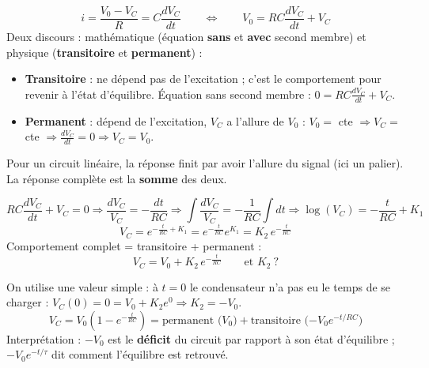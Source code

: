 \begin{thmbox}[title=Équation du passe-bas]
\[ i = \frac{V_0 - V_C}{R} = C\frac{dV_C}{dt} \qquad\Longleftrightarrow\qquad
   V_0 = RC\frac{dV_C}{dt} + V_C \]
Deux discours : mathématique (équation \textbf{sans} et \textbf{avec} second membre) et
physique (\textbf{transitoire} et \textbf{permanent}) :
\begin{itemize}
  \item \textbf{Transitoire} : ne dépend pas de l'excitation ; c'est le comportement pour
        revenir à l'état d'équilibre. Équation sans second membre :
        $0 = RC\frac{dV_C}{dt} + V_C$.
  \item \textbf{Permanent} : dépend de l'excitation, $V_C$ a l'allure de $V_0$ :
        $V_0 = $ cte $\Rightarrow V_C = $ cte $\Rightarrow \frac{dV_C}{dt} = 0 \Rightarrow V_C = V_0$.
\end{itemize}
Pour un circuit linéaire, la réponse finit par avoir l'allure du signal (ici un palier).
La réponse complète est la \textbf{somme} des deux.
\end{thmbox}


\begin{proofbox}[title=Développement]
\[ RC\frac{dV_C}{dt} + V_C = 0 \Rightarrow \frac{dV_C}{V_C} = -\frac{dt}{RC}
   \Rightarrow \int\frac{dV_C}{V_C} = -\frac1{RC}\int dt
   \Rightarrow \log(V_C) = -\frac t{RC} + K_1 \]
\[ V_C = e^{-\frac t{RC} + K_1} = e^{-\frac t{RC}}e^{K_1} = K_2\,e^{-\frac t{RC}} \]
Comportement complet = transitoire + permanent :
\[ V_C = V_0 + K_2\,e^{-\frac t{RC}} \qquad\text{et } K_2\ ? \]
\end{proofbox}


\begin{thmbox}[title={Cas particulier : condensateur déchargé, $V_C(0) = 0$}]
On utilise une valeur simple : à $t = 0$ le condensateur n'a pas eu le temps de se charger :
$V_C(0) = 0 = V_0 + K_2 e^0 \Rightarrow K_2 = -V_0$.
\[ \boxed{V_C = V_0\left(1 - e^{-\frac t{RC}}\right)} = \text{permanent ($V_0$)} + \text{transitoire ($-V_0e^{-t/RC}$)} \]
Interprétation : $-V_0$ est le \textbf{déficit} du circuit par rapport à son état
d'équilibre ; $-V_0e^{-t/\tau}$ dit comment l'équilibre est retrouvé.
\end{thmbox}



